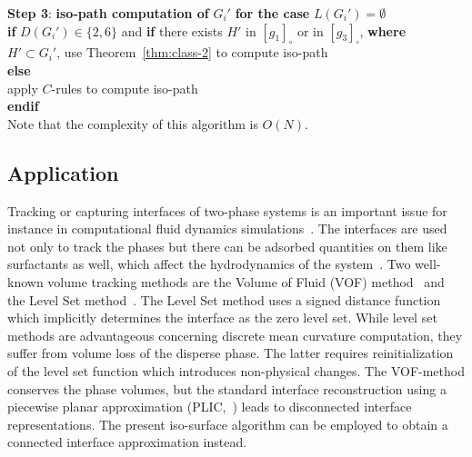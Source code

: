 \documentclass[a4paper,11pt]{article}
\begin{document}
\noindent\mbox{}\hspace{0.3cm}   {\bf Step 3}: {\bf iso-path computation of} $G_i'$ {\bf for the case} $L(G_i')=\emptyset$\\
\mbox{}\hspace{0.6cm}        {\bf if} $D(G_i')\in\{2,6\}$ and {\bf if} there exists $H'$ in $[g_1]_{\circ}$ or in
$[g_3]_{\square}$, {\bf where}\\
\mbox{}\hspace{1.1cm}              $H'\subset G_i'$, use Theorem~\ref{thm:class-2} to compute iso-path\\
\mbox{}\hspace{0.6cm}        {\bf else}\\
\mbox{}\hspace{1.1cm}           apply $C$-rules to compute iso-path \\
\mbox{}\hspace{0.6cm}        {\bf endif}\\

Note that the complexity of this algorithm is $O(N)$.

\subsection{Application}
Tracking or capturing interfaces of two-phase systems is an important issue for instance in computational
fluid dynamics simulations~\cite{opac-b1133222}. The interfaces are used not only to track the phases but
there can be adsorbed quantities on them like surfactants as well, which affect the hydrodynamics of the
system~\cite{Alke_and_Bothe}. Two well-known volume tracking methods are the Volume of Fluid (VOF)
method~\cite{Nich81} and the Level Set method~\cite{Stan02}. The Level Set method uses a signed distance
function which implicitly determines the interface as the zero level set. While level set methods are
advantageous concerning discrete mean curvature computation, they suffer from volume loss of the disperse phase.
The latter requires reinitialization of the level set function which introduces non-physical changes.
The VOF-method conserves the phase volumes, but the standard interface reconstruction using a piecewise
planar approximation (PLIC,~\cite{Rider97reconstructingvolume}) leads to disconnected interface representations.
The present iso-surface algorithm can be employed to obtain a connected interface approximation instead.
\end{document}
